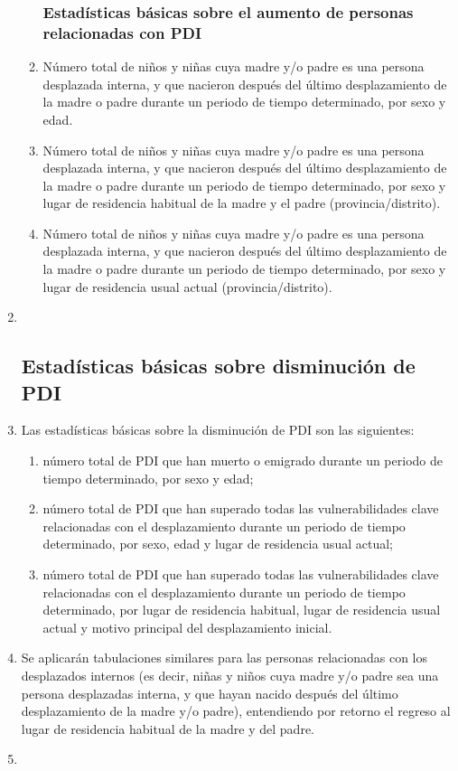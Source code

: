 \documentclass[
]{book}
\providecommand{\tightlist}{%
  \setlength{\itemsep}{0pt}\setlength{\parskip}{0pt}}
\begin{document}
\begin{enumerate}
\begin{enumerate}
{    \subsubsection{Estadísticas básicas sobre el aumento de personas relacionadas con PDI}\label{estaduxedsticas-buxe1sicas-sobre-el-aumento-de-personas-relacionadas-con-pdi}}
  \item
    Número total de niños y niñas cuya madre y/o padre es una persona desplazada interna, y que nacieron después del último desplazamiento de la madre o padre durante un periodo de tiempo determinado, por sexo y edad.
  \item
    Número total de niños y niñas cuya madre y/o padre es una persona desplazada interna, y que nacieron después del último desplazamiento de la madre o padre durante un periodo de tiempo determinado, por sexo y lugar de residencia habitual de la madre y el padre (provincia/distrito).
  \item
    Número total de niños y niñas cuya madre y/o padre es una persona desplazada interna, y que nacieron después del último desplazamiento de la madre o padre durante un periodo de tiempo determinado, por sexo y lugar de residencia usual actual (provincia/distrito).
  \end{enumerate}
\item ~
  \hypertarget{estaduxedsticas-buxe1sicas-sobre-disminuciuxf3n-de-pdi}{%
  \subsection{Estadísticas básicas sobre disminución de PDI}\label{estaduxedsticas-buxe1sicas-sobre-disminuciuxf3n-de-pdi}}
\item
  Las estadísticas básicas sobre la disminución de PDI son las siguientes:

  \begin{enumerate}
  \def\labelenumii{\arabic{enumii}.}
  \tightlist
  \item
    número total de PDI que han muerto o emigrado durante un periodo de tiempo determinado, por sexo y edad;
  \item
    número total de PDI que han superado todas las vulnerabilidades clave relacionadas con el desplazamiento durante un periodo de tiempo determinado, por sexo, edad y lugar de residencia usual actual;
  \item
    número total de PDI que han superado todas las vulnerabilidades clave relacionadas con el desplazamiento durante un periodo de tiempo determinado, por lugar de residencia habitual, lugar de residencia usual actual y motivo principal del desplazamiento inicial.
  \end{enumerate}
\item
  Se aplicarán tabulaciones similares para las personas relacionadas con los desplazados internos (es decir, niñas y niños cuya madre y/o padre sea una persona desplazadas interna, y que hayan nacido después del último desplazamiento de la madre y/o padre), entendiendo por retorno el regreso al lugar de residencia habitual de la madre y del padre.
\item ~
  \hypertarget{estaduxedsticas-buxe1sicas-de-los-flujos-entre-las-subcategoruxedas-de-pdi}{%
}
\end{enumerate}
\end{document}
